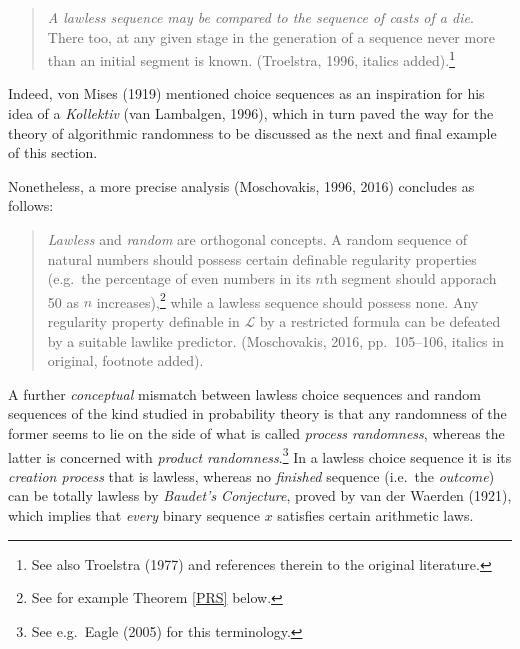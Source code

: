 \documentclass[11pt,a4paper]{article}
\numberwithin{equation}{section}
\begin{document}
\begin{itemize}
\begin{quote}
\begin{small}
\emph{A lawless sequence may be compared to the sequence of casts of a die}. There too, at any given stage in the generation of a sequence never more than an initial segment is known. (Troelstra, 1996,  {italics added}).\footnote{See also Troelstra (1977) and references therein to the original literature.}
\end{small}
\end{quote}
 Indeed,  von Mises (1919) mentioned choice sequences as an inspiration for his idea of a \emph{Kollektiv}  (van Lambalgen, 1996), which in turn paved the way for the theory of algorithmic randomness to be discussed as the next and final example of this section.
 
Nonetheless, a more precise analysis (Moschovakis, 1996, 2016) concludes as follows:
\begin{quote}\begin{small}
\emph{Lawless} and \emph{random} are orthogonal concepts. A random sequence of natural numbers should possess certain definable regularity properties (e.g.\ the percentage of even numbers in its $n$th segment should apporach 50 as $n$ increases),\footnote{See for example Theorem \ref{PRS} below.} while a lawless sequence should possess none. Any regularity property definable in $\mathcal{L}$ by a restricted formula can be defeated by a suitable lawlike predictor.
 (Moschovakis, 2016, pp.\ 105--106, italics in original, footnote added).
 \end{small}
\end{quote}
 A further \emph{conceptual} mismatch between lawless choice sequences  and random sequences of the kind studied in 
 probability theory is that any randomness of the  former seems to lie on the side of what is called \emph{process randomness}, whereas the latter is concerned with \emph{product randomness}.\footnote{See e.g.\ Eagle (2005) for this terminology. } In a lawless choice sequence it is its  \emph{creation process} that is lawless, whereas no \emph{finished} sequence (i.e.\ the \emph{outcome}) can be totally lawless by  \emph{Baudet's Conjecture}, proved by van der Waerden (1921), which implies that \emph{every}  binary sequence $x$ satisfies certain arithmetic laws.


\end{itemize}
\end{document}
